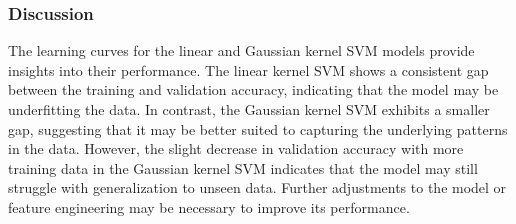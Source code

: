 \documentclass[10pt,a4paper]{article}
\begin{document}
\subsubsection{Discussion}

The learning curves  for the linear and Gaussian kernel SVM models provide insights into their performance.
The linear kernel SVM shows a consistent gap between the training and validation accuracy, indicating that the model may be underfitting the data.
In contrast, the Gaussian kernel SVM exhibits a smaller gap, suggesting that it may be better suited to capturing the underlying patterns in the data.
However, the slight decrease in validation accuracy with more training data in the Gaussian kernel SVM indicates that the model may still struggle with generalization to unseen data.
Further adjustments to the model or feature engineering may be necessary to improve its performance.
\end{document}
